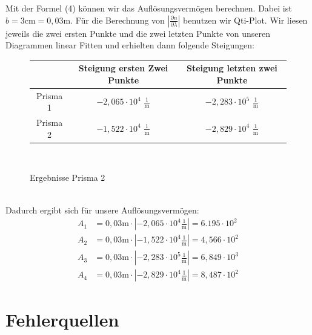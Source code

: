 \documentclass[fontsize=12pt]{scrartcl}
\renewcommand{\l}{\left\vert}
\renewcommand{\r}{\right\vert}
\begin{document}
Mit der Formel (4) können wir das Auflösungsvermögen berechnen. Dabei ist $b=3\text{cm}=0,03\text{m}$.	
Für die Berechnung von $\l \frac{\partial n}{\partial \lambda} \r$ benutzen wir Qti-Plot. Wir liesen jeweils die zwei ersten Punkte und die zwei letzten Punkte von unseren Diagrammen linear Fitten und erhielten dann folgende Steigungen:
\begin{figure}[h]
\centering
\caption{Ergebnisse Prisma 2}
\begin{tabular}{|c|c|c|} \hline
 & Steigung ersten Zwei Punkte & Steigung letzten zwei Punkte   \\ \hline
Prisma 1 &	$-2,065\cdot 10^{4}$ $\frac{1}{\text{m}}$	&	$-2,283\cdot 10^{5}$ $\frac{1}{\text{m}}$	\\ \hline
Prisma 2 &	$-1,522\cdot 10^{4}$ $\frac{1}{\text{m}}$	&	$-2,829\cdot 10^{4}$ $\frac{1}{\text{m}}$	\\ \hline
\end{tabular} \\
\end{figure}\\
\noindent
Dadurch ergibt sich für unsere Auflösungsvermögen:
\begin{align*}
A _1&=0,03\text{m}\cdot\l -2,065\cdot 10^{4} \frac{1}{\text{m}}  \r = 6.195\cdot 10^{2}\\
A_2&=0,03\text{m}\cdot\l -1,522\cdot 10^{4} \frac{1}{\text{m}} \r = 4,566\cdot 10^{2}\\
A_3&=0,03\text{m}\cdot\l -2,283\cdot 10^{5} \frac{1}{\text{m}} \r = 6,849\cdot 10^{3}\\
A_4&=0,03\text{m}\cdot\l -2,829\cdot 10^{4} \frac{1}{\text{m}} \r = 8,487\cdot 10^{2}
\end{align*}
\newpage

\section{Fehlerquellen}
\end{document}
